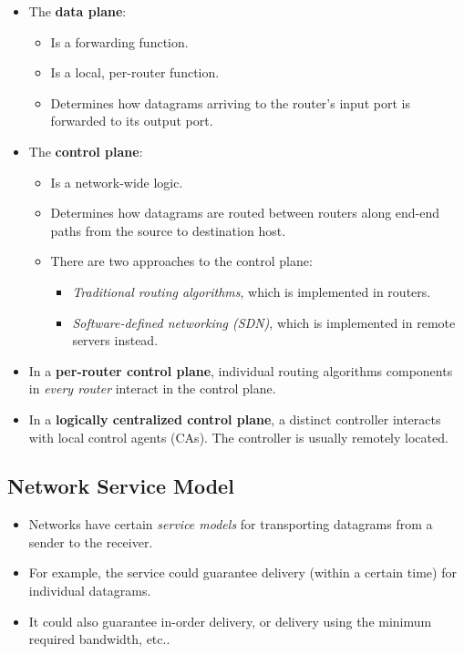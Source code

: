 \documentclass{article}
\begin{document}
\begin{itemize}
\item The {\bf data plane}:
\begin{itemize}
\item Is a forwarding function.
\item Is a local, per-router function.
\item Determines how datagrams arriving to the router's input port is forwarded to its output port.
\end{itemize}
\item The {\bf control plane}:
\begin{itemize}
\item Is a network-wide logic.
\item Determines how datagrams are routed between routers along end-end paths from the source to destination host.
\item There are two approaches to the control plane:
\begin{itemize}
\item \emph{Traditional routing algorithms}, which is implemented in routers.
\item \emph{Software-defined networking (SDN)}, which is implemented in remote servers instead.
\end{itemize}
\end{itemize}
\item In a {\bf per-router control plane}, individual routing algorithms components in \emph{every router} interact in the control plane.
\item In a {\bf logically centralized control plane}, a distinct controller interacts with local control agents (CAs). The controller is usually remotely located.
\end{itemize}

\subsection{Network Service Model}

\begin{itemize}
\item Networks have certain \emph{service models} for transporting datagrams from a sender to the receiver.
\item For example, the service could guarantee delivery (within a certain time) for individual datagrams.
\item It could also guarantee in-order delivery, or delivery using the minimum required bandwidth, etc..
\end{itemize}
\end{document}
